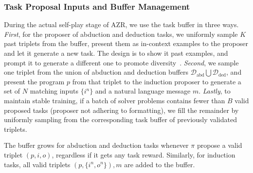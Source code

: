 \documentclass{article}
\begin{document}
\subsubsection{Task Proposal Inputs and Buffer Management}
\label{sec:buffer_usage}
During the actual self-play stage of AZR, we use the task buffer in three ways. \emph{First}, for the proposer of abduction and deduction tasks, we uniformly sample \(K\) past triplets from the buffer, present them as in-context examples to the proposer and let it generate a new task. The design is to show it past examples, and prompt it to generate a different one to promote diversity~\citep{zhao2024diver}. \emph{Second}, we sample one triplet from the union of abduction and deduction buffers \(\mathcal{D}_\text{abd}\bigcup\mathcal{D}_\text{ded}\), and present the program \(p\) from that triplet to the induction proposer to generate a set of \(N\) matching inputs \(\{i^n\}\) and a natural language message \(m\). \emph{Lastly}, to maintain stable training, if a batch of solver problems contains fewer than \(B\) valid proposed tasks (proposer not adhering to formatting), we fill the remainder by uniformly sampling from the corresponding task buffer of previously validated triplets.

The buffer grows for abduction and deduction tasks whenever \(\pi\) propose a valid triplet \((p,i,o)\), regardless if it gets any task reward. Similarly, for induction tasks, all valid triplets \((p,\{i^n,o^n\}),m\) are added to the buffer.
\end{document}
